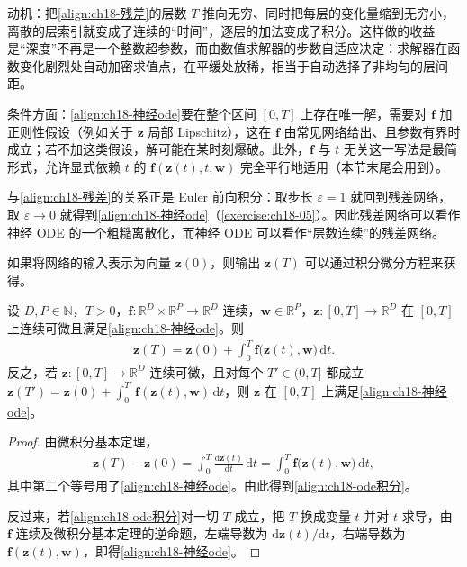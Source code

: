 \documentclass[../../main.tex]{subfiles}
\begin{document}
\begin{remark}
动机：把\eqref{align:ch18-残差}的层数 $T$ 推向无穷、同时把每层的变化量缩到无穷小，离散的层索引就变成了连续的“时间”，逐层的加法变成了积分。这样做的收益是“深度”不再是一个整数超参数，而由数值求解器的步数自适应决定：求解器在函数变化剧烈处自动加密求值点，在平缓处放稀，相当于自动选择了非均匀的层间距。

条件方面：\eqref{align:ch18-神经ode}要在整个区间 $[0,T]$ 上存在唯一解，需要对 $\bm{f}$ 加正则性假设（例如关于 $\bm{z}$ 局部 Lipschitz），这在 $\bm{f}$ 由常见网络给出、且参数有界时成立；若不加这类假设，解可能在某时刻爆破。此外，$\bm{f}$ 与 $t$ 无关这一写法是最简形式，允许显式依赖 $t$ 的 $\bm{f}(\bm{z}(t),t,\bm{w})$ 完全平行地适用（本节末尾会用到）。

与\eqref{align:ch18-残差}的关系正是 Euler 前向积分：取步长 $\varepsilon=1$ 就回到残差网络，取 $\varepsilon\to0$ 就得到\eqref{align:ch18-神经ode}（\cref{exercise:ch18-05}）。因此残差网络可以看作神经 ODE 的一个粗糙离散化，而神经 ODE 可以看作“层数连续”的残差网络。
\end{remark}

如果将网络的输入表示为向量 $\bm{z}(0)$，则输出 $\bm{z}(T)$ 可以通过积分微分方程来获得。

\begin{proposition}\label{proposition:ch18-ode积分}
设 $D,P\in\mathbb{N}$，$T>0$，$\bm{f}:\mathbb{R}^{D}\times\mathbb{R}^{P}\to\mathbb{R}^{D}$ 连续，$\bm{w}\in\mathbb{R}^{P}$，$\bm{z}:[0,T]\to\mathbb{R}^{D}$ 在 $[0,T]$ 上连续可微且满足\eqref{align:ch18-神经ode}。则
\begin{align}
  \bm{z}(T)=\bm{z}(0)+\int_{0}^{T}\bm{f}\big(\bm{z}(t),\bm{w}\big)\,\mathrm{d}t.\label{align:ch18-ode积分}
\end{align}
反之，若 $\bm{z}:[0,T]\to\mathbb{R}^{D}$ 连续可微，且对每个 $T'\in(0,T]$ 都成立 $\bm{z}(T')=\bm{z}(0)+\int_{0}^{T'}\bm{f}(\bm{z}(t),\bm{w})\,\mathrm{d}t$，则 $\bm{z}$ 在 $[0,T]$ 上满足\eqref{align:ch18-神经ode}。
\end{proposition}

\begin{proof}
由微积分基本定理，
\begin{align*}
  \bm{z}(T)-\bm{z}(0)=\int_{0}^{T}\frac{\mathrm{d}\bm{z}(t)}{\mathrm{d}t}\,\mathrm{d}t=\int_{0}^{T}\bm{f}\big(\bm{z}(t),\bm{w}\big)\,\mathrm{d}t,
\end{align*}
其中第二个等号用了\eqref{align:ch18-神经ode}。由此得到\eqref{align:ch18-ode积分}。

反过来，若\eqref{align:ch18-ode积分}对一切 $T$ 成立，把 $T$ 换成变量 $t$ 并对 $t$ 求导，由 $\bm{f}$ 连续及微积分基本定理的逆命题，左端导数为 $\mathrm{d}\bm{z}(t)/\mathrm{d}t$，右端导数为 $\bm{f}(\bm{z}(t),\bm{w})$，即得\eqref{align:ch18-神经ode}。
\end{proof}
\end{document}
